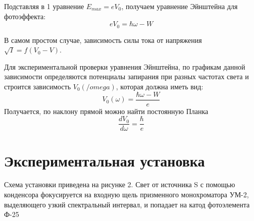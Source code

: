 \documentclass[a4paper,12pt]{article}
\begin{document}
Подставляя в 1 уравнение $E_{max} = eV_0$, получаем уравнение Эйнштейна для фотоэффекта:
\begin{equation}
eV_0 = \hbar \omega - W
\end{equation}

В самом простом случае, зависимость силы тока от напряжения $\sqrt{I} = f(V_0-V)$.

Для экспериментальной проверки уравнения Эйнштейна, по графикам данной зависимости определяются потенциалы запирания при разных частотах света и строится зависимость $V_0(/omega)$, которая должна иметь вид:
\begin{equation}
V_0(\omega) = \frac{\hbar \omega - W}{e}
\end{equation}
Получается, по наклону прямой можно найти постоянную Планка
\begin{equation}
\frac{dV_0}{d\omega} = \frac{\hbar}{e}
\end{equation}

\section{Экспериментальная  установка}
Схема установки приведена на рисунке 2. Свет от источника S с помощью конденсора фокусируется на входную щель призменного монохроматора УМ-2, выделяющего узкий спектральный интервал, и попадает на катод фотоэлемента Ф-25

\end{document}
